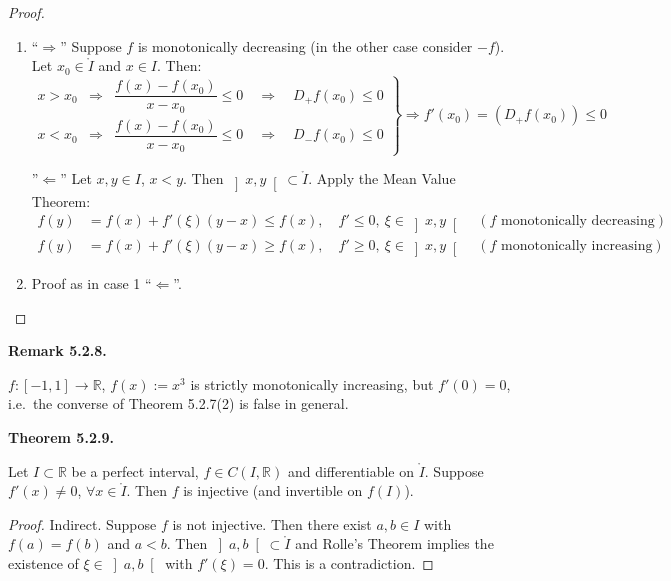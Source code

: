 \documentclass[12pt]{article}
\newenvironment{satz}[1]{%
  \par\vspace{6pt}\noindent\textbf{Theorem #1.}\itshape\space
}{%
  \par\vspace{6pt}
}
\newenvironment{bemerkung}[1]{%
  \par\vspace{6pt}\noindent\textbf{Remark #1.}\itshape\space
}{%
  \par\vspace{6pt}
}
\begin{document}
\begin{proof}
\begin{enumerate}
\item ``$\Rightarrow$'' Suppose $f$ is monotonically decreasing (in the other case consider $-f$). Let $x_0 \in \mathring{I}$ and $x \in I$. Then:
\[
\left.
\begin{array}{lll}
x > x_0 & \Rightarrow & \dfrac{f(x)-f(x_0)}{x-x_0} \leq 0 \quad \Rightarrow \quad D_+f(x_0) \leq 0 \\[8pt]
x < x_0 & \Rightarrow & \dfrac{f(x)-f(x_0)}{x-x_0} \leq 0 \quad \Rightarrow \quad D_-f(x_0) \leq 0
\end{array}
\right\} \Rightarrow f'(x_0) = (D_+f(x_0)) \leq 0
\]

''$\Leftarrow$'' Let $x, y \in I$, $x < y$. Then $\left]x, y\right[ \subset \mathring{I}$. Apply the Mean Value Theorem:
\begin{align*}
    f(y) &= f(x) + f'(\xi)(y-x) \leq f(x), \quad f' \leq 0,\ \xi \in \left]x,y\right[ \quad (f \text{ monotonically decreasing})\\
    f(y) &= f(x) + f'(\xi)(y-x) \geq f(x), \quad f' \geq 0,\ \xi \in \left]x,y\right[ \quad (f \text{ monotonically increasing})
\end{align*}

\item Proof as in case 1 ``$\Leftarrow$''.
\end{enumerate}
\end{proof}

\begin{bemerkung}{5.2.8}
$f : [-1,1] \to \mathbb{R}$, $f(x) := x^3$ is strictly monotonically increasing, but $f'(0) = 0$, i.e.\ the converse of Theorem 5.2.7(2) is false in general.
\end{bemerkung}

\begin{satz}{5.2.9}
Let $I \subset \mathbb{R}$ be a perfect interval, $f \in C(I,\mathbb{R})$ and differentiable on $\mathring{I}$. Suppose $f'(x) \neq 0$, $\forall x \in \mathring{I}$. Then $f$ is injective (and invertible on $f(I)$).
\end{satz}

\begin{proof}
Indirect. Suppose $f$ is not injective. Then there exist $a, b \in I$ with $f(a) = f(b)$ and $a < b$. Then $\left]a,b\right[ \subset \mathring{I}$ and Rolle's Theorem implies the existence of $\xi \in \left]a,b\right[$ with $f'(\xi) = 0$. This is a contradiction.
\end{proof}
\end{document}
